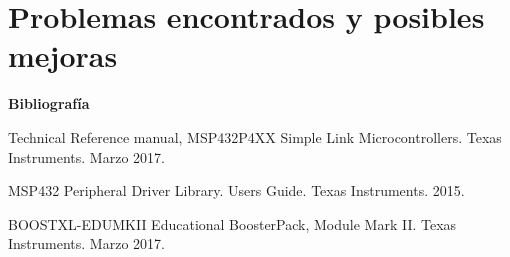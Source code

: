 \section{Problemas encontrados y posibles mejoras}


\textbf{ Bibliografía}

Technical Reference manual, MSP432P4XX Simple Link Microcontrollers. Texas Instruments. Marzo 2017.

MSP432 Peripheral Driver Library. Users Guide. Texas Instruments. 2015.

BOOSTXL-EDUMKII Educational BoosterPack, Module Mark II. Texas Instruments. Marzo 2017.


%
%

